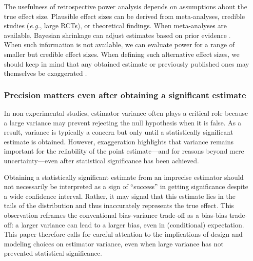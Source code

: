 \documentclass[usletter, 12pt]{article}
\begin{document}
				The usefulness of retrospective power analysis depends on assumptions about the true effect size. Plausible effect sizes can be derived from meta-analyses, credible studies (\textit{e.g.}, large RCTs), or theoretical findings. When meta-analyses are available, Bayesian shrinkage can adjust estimates based on prior evidence \citep{zwet_proposal_2021, zwet_significance_2021, zwet_statistical_2021}.  When such information is not available, we can evaluate power for a range of smaller but credible effect sizes. When defining such alternative effect sizes, we should keep in mind that any obtained estimate or previously published ones may themselves be exaggerated \citep{gelman_beyond_2014}.
				
		
		
			\subsubsection{Precision matters even after obtaining a significant estimate}
			
				In non-experimental studies, estimator variance often plays a critical role because a large variance may prevent rejecting the null hypothesis when it is false. As a result, variance is typically a concern but only until a statistically significant estimate is obtained. However, exaggeration highlights that variance remains important for the reliability of the point estimate---and for reasons beyond mere uncertainty---even after statistical significance has been achieved.
			
				 Obtaining a statistically significant estimate from an imprecise estimator should not necessarily be interpreted as a sign of ``success'' in getting significance despite a wide confidence interval. Rather, it may signal that this estimate lies in the tails of the distribution and thus inaccurately represents the true effect. This observation reframes the conventional bias-variance trade-off as a bias-bias trade-off: a larger variance can lead to a larger bias, even in (conditional) expectation. This paper therefore calls for careful attention to the implications of design and modeling choices on estimator variance, even when large variance has not prevented statistical significance.
			
\end{document}
